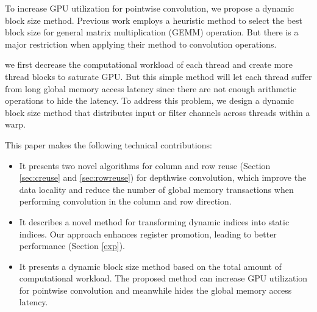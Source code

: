 To increase GPU utilization for pointwise convolution, we propose a dynamic block size method. 
Previous work \cite{li2019coordinated} employs a heuristic method to select the best block size for general matrix multiplication (GEMM) operation. 
But there is a major restriction when applying their method to convolution operations.
 
we first decrease the computational workload of each thread and create more thread blocks to saturate GPU. 
But this simple method will let each thread suffer from long global memory access latency since there are not enough arithmetic operations to hide the latency.
To address this problem, we design a dynamic block size method that distributes input or filter channels across threads within a warp. 

This paper makes the following technical contributions:
\begin{itemize}
    \item It presents two novel algorithms for column and row reuse (Section \ref{sec:creuse} and \ref{sec:rowreuse}) for depthwise convolution, which improve the data locality and reduce the number of global memory transactions when performing convolution in the column and row direction.
    \item It describes a novel method for transforming dynamic indices into static indices. 
    Our approach enhances register promotion, leading to better performance (Section \ref{exp}).
    \item It presents a dynamic block size method based on the total amount of computational workload. The proposed method can increase GPU utilization for pointwise convolution and meanwhile hides the global memory access latency. 
\end{itemize}
